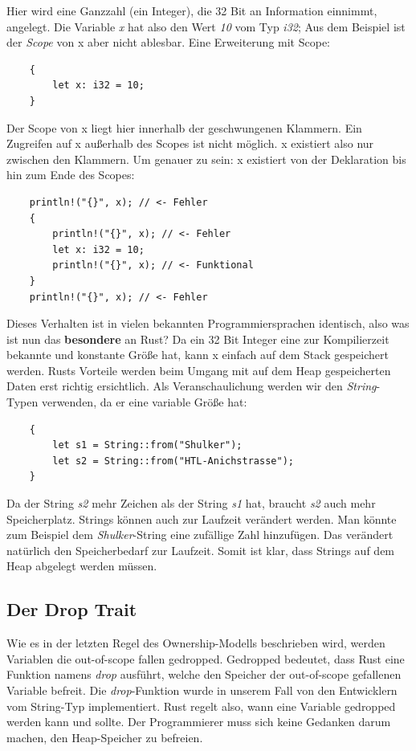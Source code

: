 Hier wird eine Ganzzahl (ein Integer), die 32 Bit an Information einnimmt, angelegt. Die Variable \textit{x} hat also den Wert \textit{10} vom Typ \textit{i32};
Aus dem Beispiel ist der \textit{Scope} von x aber nicht ablesbar. Eine Erweiterung mit Scope:

\begin{lstlisting}
    {
        let x: i32 = 10;
    }
\end{lstlisting}

Der Scope von x liegt hier innerhalb der geschwungenen Klammern. Ein Zugreifen auf x außerhalb des Scopes ist nicht möglich. x existiert also nur
zwischen den Klammern. Um genauer zu sein: x existiert von der Deklaration bis hin zum Ende des Scopes:
\begin{lstlisting}
    println!("{}", x); // <- Fehler
    {
        println!("{}", x); // <- Fehler
        let x: i32 = 10;
        println!("{}", x); // <- Funktional
    }
    println!("{}", x); // <- Fehler
\end{lstlisting}

Dieses Verhalten ist in vielen bekannten Programmiersprachen identisch, also was ist nun das \textbf{besondere} an Rust? Da ein 32 Bit Integer
eine zur Kompilierzeit bekannte und konstante Größe hat, kann x einfach auf dem Stack gespeichert werden. Rusts Vorteile werden beim Umgang mit
auf dem Heap gespeicherten Daten erst richtig ersichtlich. Als Veranschaulichung werden wir den \textit{String}-Typen verwenden, da er eine
variable Größe hat:
\begin{lstlisting}
    {
        let s1 = String::from("Shulker");
        let s2 = String::from("HTL-Anichstrasse");
    }
\end{lstlisting}

Da der String \textit{s2} mehr Zeichen als der String \textit{s1} hat, braucht \textit{s2} auch mehr Speicherplatz. Strings können auch zur Laufzeit
verändert werden. Man könnte zum Beispiel dem \textit{Shulker}-String eine zufällige Zahl hinzufügen. Das verändert natürlich den Speicherbedarf zur
Laufzeit. Somit ist klar, dass Strings auf dem Heap abgelegt werden müssen.

\subsection{Der Drop Trait}
Wie es in der letzten Regel des Ownership-Modells beschrieben wird, werden Variablen die out-of-scope fallen gedropped. Gedropped bedeutet, dass Rust
eine Funktion namens \textit{drop} ausführt, welche den Speicher der out-of-scope gefallenen Variable befreit. Die \textit{drop}-Funktion wurde in
unserem Fall von den Entwicklern vom String-Typ implementiert. Rust regelt also, wann eine Variable gedropped werden kann und sollte. Der Programmierer
muss sich keine Gedanken darum machen, den Heap-Speicher zu befreien.

